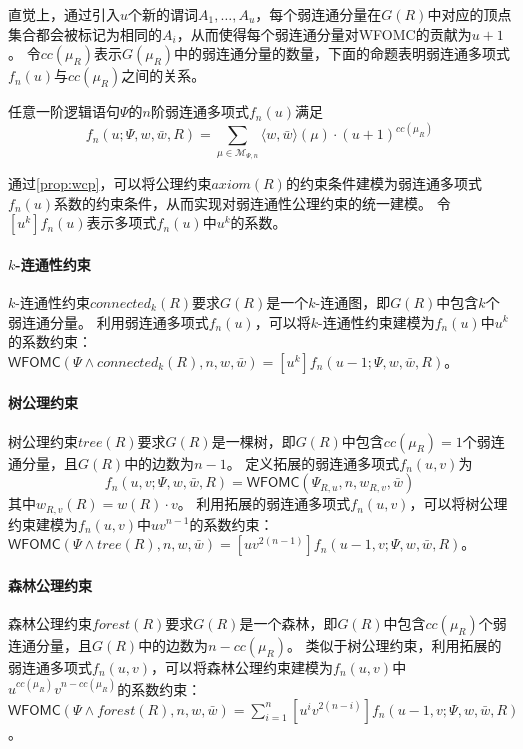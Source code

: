 \documentclass[12pt,UTF8,AutoFakeBold=3,a4paper]{ctexart} %
\newcommand{\weight}{w}
\newcommand{\negweight}{\bar{w}}
\newcommand{\wfomc}{WFOMC}
\newcommand{\symwfomc}{\ensuremath{\mathsf{WFOMC}}}
\newcommand{\fomodels}[2]{\mathcal{M}_{#1, #2}}
\newcommand{\typeweight}[1]{\langle \weight, \negweight\rangle(#1)}
\begin{document}
直觉上，通过引入$u$个新的谓词$A_1, \dots, A_u$，每个弱连通分量在$G(R)$中对应的顶点集合都会被标记为相同的$A_i$，从而使得每个弱连通分量对\wfomc{}的贡献为$u+1$。
令$cc(\mu_R)$表示$G(\mu_R)$中的弱连通分量的数量，下面的命题表明弱连通多项式$f_n(u)$与$cc(\mu_R)$之间的关系。

\begin{proposition}\label{prop:wcp}
  任意一阶逻辑语句$\Psi$的$n$阶弱连通多项式$f_n(u)$满足
  \begin{equation*}
    f_n(u;\Psi, \weight, \negweight, R) = \sum_{\mu \in \fomodels{\Psi}{n}} \typeweight{\mu} \cdot (u+1)^{cc(\mu_R)}
  \end{equation*}
\end{proposition}

通过\cref{prop:wcp}，可以将公理约束$axiom(R)$的约束条件建模为弱连通多项式$f_n(u)$系数的约束条件，从而实现对弱连通性公理约束的统一建模。
令$[u^k] f_n(u)$表示多项式$f_n(u)$中$u^k$的系数。

\paragraph{$k$-连通性约束} $k$-连通性约束$connected_k(R)$要求$G(R)$是一个$k$-连通图，即$G(R)$中包含$k$个弱连通分量。
利用弱连通多项式$f_n(u)$，可以将$k$-连通性约束建模为$f_n(u)$中$u^k$的系数约束：$\symwfomc(\Psi \land connected_k(R), n, \weight, \negweight) = [u^k] f_n(u - 1; \Psi, \weight, \negweight, R)$。

\paragraph{树公理约束} 树公理约束$tree(R)$要求$G(R)$是一棵树，即$G(R)$中包含$cc(\mu_R) = 1$个弱连通分量，且$G(R)$中的边数为$n-1$。
定义拓展的弱连通多项式$f_n(u,v)$为
\begin{equation*}
  f_n(u, v; \Psi, \weight, \negweight, R) = \symwfomc(\Psi_{R,u}, n, \weight_{R,v}, \negweight)
\end{equation*}
其中$\weight_{R,v}(R) = \weight(R) \cdot v$。
利用拓展的弱连通多项式$f_n(u,v)$，可以将树公理约束建模为$f_n(u,v)$中$uv^{n-1}$的系数约束：$\symwfomc(\Psi \land tree(R), n, \weight, \negweight) = [uv^{2(n-1)} ] f_n(u-1, v; \Psi, \weight, \negweight, R)$。

\paragraph{森林公理约束} 森林公理约束$forest(R)$要求$G(R)$是一个森林，即$G(R)$中包含$cc(\mu_R)$个弱连通分量，且$G(R)$中的边数为$n - cc(\mu_R)$。
类似于树公理约束，利用拓展的弱连通多项式$f_n(u,v)$，可以将森林公理约束建模为$f_n(u,v)$中$u^{cc(\mu_R)}v^{n-cc(\mu_R)}$的系数约束：$\symwfomc(\Psi \land forest(R), n, \weight, \negweight) = \sum_{i=1}^n [u^iv^{2(n-i)}] f_n(u-1, v; \Psi, \weight, \negweight, R)$。
\end{document}
